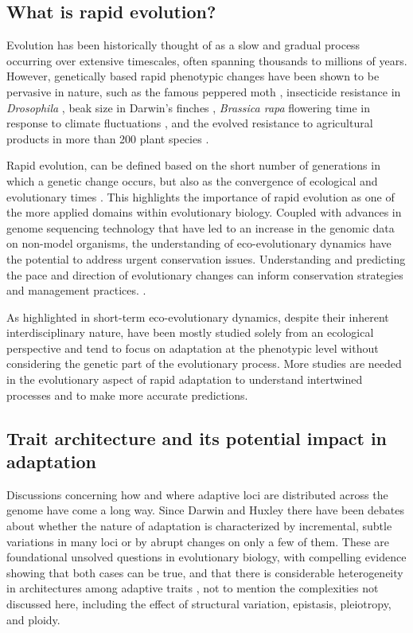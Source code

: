 \documentclass{article}
\begin{document}
\subsection{What is rapid evolution?}
Evolution has been historically thought of as a slow and gradual process occurring over extensive timescales, often spanning thousands to millions of years. However, genetically based rapid phenotypic changes have been shown to be pervasive in nature, such as the famous peppered moth \citep{Cook2013-bs}, insecticide resistance in \textit{Drosophila} \citep{Daborn2002-is}, beak size in Darwin’s finches \citep{Grant2008-uc}, \textit{Brassica rapa} flowering time in response to climate fluctuations \citep{Franks2007-ys}, and the evolved resistance to agricultural products in more than 200 plant species \citep{Heap2020}. 

Rapid evolution, can be defined based on the short number of generations in which a genetic change occurs, but also as the convergence of ecological and evolutionary times \citep{Hairston2005-qo}. This highlights the importance of rapid evolution as one of the more applied domains within evolutionary biology. Coupled with advances in genome sequencing technology that have led to an increase in the genomic data on non-model organisms, the understanding of eco-evolutionary dynamics have the potential to address urgent conservation issues. Understanding and predicting the pace and direction of evolutionary changes can inform conservation strategies and management practices. \citep{Bay2017-uu, Coulson2017-yh, Forester2022-yl}.

As highlighted in \citep{Yamamichi2022-yj} short-term eco-evolutionary dynamics, despite their inherent interdisciplinary nature, have been mostly studied solely from an ecological perspective and tend to focus on adaptation at the phenotypic level without considering the genetic part of the evolutionary process. More studies are needed in the evolutionary aspect of rapid adaptation to understand intertwined processes and to make more accurate predictions. \citep{Rudman2022-uc}

\subsection{Trait architecture and its potential impact in adaptation}
Discussions concerning how and where adaptive loci are distributed across the genome have come a long way. Since Darwin \citeyearpar{Darwin1859-yh} and Huxley \citeyearpar{Huxley1860} there have been debates about whether the nature of adaptation is characterized by incremental, subtle variations in many loci or by abrupt changes on only a few of them. These are foundational unsolved questions in evolutionary biology, with compelling evidence showing that both cases can be true, and that there is considerable heterogeneity in architectures among adaptive traits \citep{Orr1992-xj, Orr1998-pr}, not to mention the complexities not discussed here, including the effect of structural variation, epistasis, pleiotropy, and ploidy. 
\end{document}
